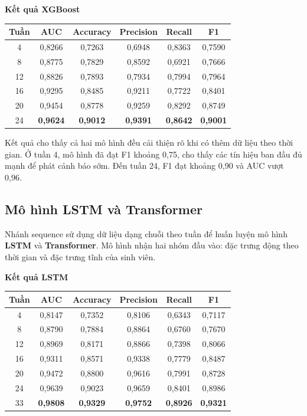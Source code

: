 \begin{center}
\small
\textbf{Kết quả XGBoost}

\renewcommand{\arraystretch}{1.3}
\begin{tabular}{|c|c|c|c|c|c|}
\hline
\textbf{Tuần} & \textbf{AUC} & \textbf{Accuracy} & \textbf{Precision} & \textbf{Recall} & \textbf{F1} \\
\hline
4  & 0,8266 & 0,7263 & 0,6948 & 0,8363 & 0,7590 \\
8  & 0,8775 & 0,7829 & 0,8592 & 0,6921 & 0,7666 \\
12 & 0,8826 & 0,7893 & 0,7934 & 0,7994 & 0,7964 \\
16 & 0,9295 & 0,8485 & 0,9211 & 0,7722 & 0,8401 \\
20 & 0,9454 & 0,8778 & 0,9259 & 0,8292 & 0,8749 \\
24 & \textbf{0,9624} & \textbf{0,9012} & \textbf{0,9391} & \textbf{0,8642} & \textbf{0,9001} \\
\hline
\end{tabular}
\end{center}


Kết quả cho thấy cả hai mô hình đều cải thiện rõ khi có thêm dữ liệu theo thời gian. Ở tuần
4, mô hình đã đạt F1 khoảng 0,75, cho thấy các tín hiệu ban đầu đủ mạnh để phát cảnh báo sớm.
Đến tuần 24, F1 đạt khoảng 0,90 và AUC vượt 0,96.


\subsection{Mô hình LSTM và Transformer}

Nhánh sequence sử dụng dữ liệu dạng
chuỗi theo tuần để huấn luyện mô hình \textbf{LSTM} và \textbf{Transformer}. Mô hình nhận hai nhóm đầu vào: đặc trưng
động theo thời gian và đặc trưng tĩnh của sinh viên. 

\begin{center}
\small
\textbf{Kết quả LSTM}

\renewcommand{\arraystretch}{1.3}
\begin{tabular}{|c|c|c|c|c|c|}
\hline
\textbf{Tuần} & \textbf{AUC} & \textbf{Accuracy} & \textbf{Precision} & \textbf{Recall} & \textbf{F1} \\
\hline
4  & 0,8147 & 0,7352 & 0,8106 & 0,6343 & 0,7117 \\
8  & 0,8790 & 0,7884 & 0,8864 & 0,6760 & 0,7670 \\
12 & 0,8969 & 0,8171 & 0,8866 & 0,7398 & 0,8066 \\
16 & 0,9311 & 0,8571 & 0,9338 & 0,7779 & 0,8487 \\
20 & 0,9472 & 0,8800 & 0,9616 & 0,7991 & 0,8728 \\
24 & 0,9639 & 0,9023 & 0,9659 & 0,8401 & 0,8986 \\
33 & \textbf{0,9808} & \textbf{0,9329} & \textbf{0,9752} & \textbf{0,8926} & \textbf{0,9321} \\
\hline
\end{tabular}
\end{center}

